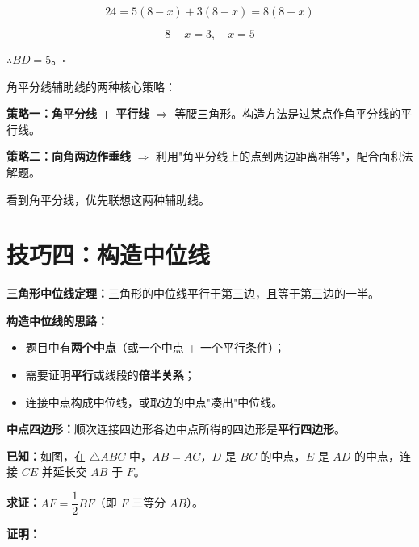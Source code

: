 \documentclass[12pt, a4paper]{ctexart}
\begin{document}
\[24 = 5(8-x) + 3(8-x) = 8(8-x)\]

\[8 - x = 3, \quad x = 5\]

\(\therefore BD = 5\)。\hfill\(\square\)

\begin{tipbox}[方法总结]
角平分线辅助线的两种核心策略：

\textbf{策略一：角平分线 + 平行线} \(\Rightarrow\) 等腰三角形。构造方法是过某点作角平分线的平行线。

\textbf{策略二：向角两边作垂线} \(\Rightarrow\) 利用"角平分线上的点到两边距离相等"，配合面积法解题。

看到角平分线，优先联想这两种辅助线。
\end{tipbox}

\section*{\textcolor{mainblue}{技巧四：构造中位线}}

\begin{knowledgebox}[什么是中位线？]
\textbf{三角形中位线定理：}三角形的中位线平行于第三边，且等于第三边的一半。

\medskip
\noindent\textbf{构造中位线的思路：}
\begin{itemize}[leftmargin=1.5em]
  \item 题目中有\textbf{两个中点}（或一个中点 + 一个平行条件）；
  \item 需要证明\textbf{平行}或线段的\textbf{倍半关系}；
  \item 连接中点构成中位线，或取边的中点"凑出"中位线。
\end{itemize}

\medskip
\noindent\textbf{中点四边形：}顺次连接四边形各边中点所得的四边形是\textbf{平行四边形}。
\end{knowledgebox}

\begin{examplebox}[【例题 4-1】取中点构造中位线]
\textbf{已知：}如图，在 \(\triangle ABC\) 中，\(AB = AC\)，\(D\) 是 \(BC\) 的中点，\(E\) 是 \(AD\) 的中点，连接 \(CE\) 并延长交 \(AB\) 于 \(F\)。

\textbf{求证：}\(AF = \dfrac{1}{2}BF\)（即 \(F\) 三等分 \(AB\)）。
\end{examplebox}

\noindent\textbf{证明：}
\end{document}
